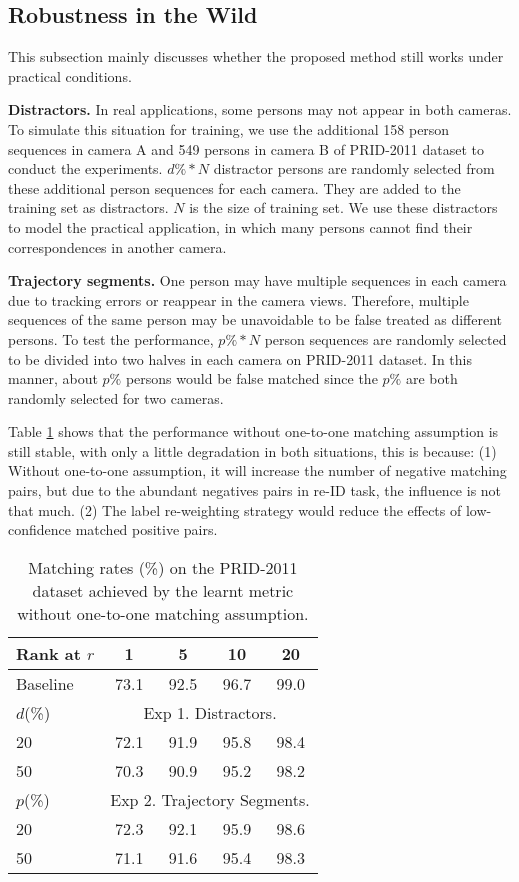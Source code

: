 \documentclass[10pt,twocolumn,letterpaper]{article}
\begin{document}
\subsection{Robustness in the Wild}\label{sec:exp_o}
This subsection mainly discusses whether the proposed method still works under practical conditions.

\textbf{Distractors.} In real applications, some persons may not appear in both cameras. To simulate this situation for training, we use the additional 158 person sequences in camera A and 549 persons in camera B of PRID-2011 dataset to conduct the experiments. $d\% * N$ distractor persons are randomly selected from these additional person sequences for each camera. They are added to the training set as distractors. $N$ is the size of training set. We use these distractors to model the practical application, in which many persons cannot find their correspondences in another camera.

\textbf{Trajectory segments.} One person may have multiple sequences in each camera due to tracking errors or reappear in the camera views. Therefore, multiple sequences of the same person may be unavoidable to be false treated as different persons. To test the performance, $p\% *N$ person sequences are randomly selected to be divided into two halves in each camera on PRID-2011 dataset. In this manner, about $p\%$ persons would be false matched since the $p\%$ are both randomly selected for two cameras.

Table \ref{tab:exp_o} shows that the performance without one-to-one matching assumption is still stable, with only a little degradation in both situations, this is because: (1) Without one-to-one assumption, it will increase the number of negative matching pairs, but due to the abundant negatives pairs in re-ID task, the influence is not that much. (2) The label re-weighting strategy would reduce the effects of low-confidence matched positive pairs.
\begin{table}[t]\small
\centering
\setlength{\tabcolsep}{12pt}
  \begin{tabular*}{\columnwidth}{l|cccc}
  \hline
  Rank at $r$ & 1  &5  & 10    & 20 \\\hline
  Baseline  & 73.1  &92.5   & 96.7   &99.0\\ \hline
  $d$(\%)    & \multicolumn{4}{c}{Exp 1. Distractors.} \\ \hline
  20       & 72.1  &91.9 & 95.8   & 98.4\\
  50       & 70.3 &90.9 & 95.2  & 98.2\\ \hline
  $p$(\%)    &\multicolumn{4}{c}{Exp 2. Trajectory Segments.} \\ \hline
  20       & 72.3  &92.1 & 95.9   & 98.6\\
  50       & 71.1  &91.6 & 95.4   & 98.3\\ \hline
 \end{tabular*}
 \caption{\label{tab:exp_o}\small{Matching rates (\%) on the PRID-2011 dataset achieved by the learnt metric without one-to-one matching assumption.}}
\end{table}
\end{document}
